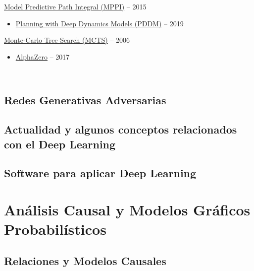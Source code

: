 \documentclass[
  a4paper,
  DIV=11,
  numbers=noendperiod]{scrreprt}
\providecommand{\tightlist}{%
  \setlength{\itemsep}{0pt}\setlength{\parskip}{0pt}}\usepackage{longtable,booktabs,array}
\begin{document}
\href{https://arxiv.org/abs/1509.01149}{Model Predictive Path Integral
(MPPI)} -- 2015

\begin{itemize}
\tightlist
\item
  \href{https://arxiv.org/abs/1909.11652}{Planning with Deep Dynamics
  Models (PDDM)} -- 2019
\end{itemize}

\href{https://hal.inria.fr/inria-00116992/document}{Monte-Carlo Tree
Search (MCTS)} -- 2006

\begin{itemize}
\tightlist
\item
  \href{https://arxiv.org/abs/1712.01815}{AlphaZero} -- 2017
\end{itemize}

~

\hypertarget{redes-generativas-adversarias}{%
\section{Redes Generativas
Adversarias}\label{redes-generativas-adversarias}}

\hypertarget{actualidad-y-algunos-conceptos-relacionados-con-el-deep-learning}{%
\section{Actualidad y algunos conceptos relacionados con el Deep
Learning}\label{actualidad-y-algunos-conceptos-relacionados-con-el-deep-learning}}

\hypertarget{software-para-aplicar-deep-learning}{%
\section{Software para aplicar Deep
Learning}\label{software-para-aplicar-deep-learning}}


\hypertarget{anuxe1lisis-causal-y-modelos-gruxe1ficos-probabiluxedsticos}{%
\chapter{Análisis Causal y Modelos Gráficos
Probabilísticos}\label{anuxe1lisis-causal-y-modelos-gruxe1ficos-probabiluxedsticos}}

\hypertarget{relaciones-y-modelos-causales}{%
\section{Relaciones y Modelos
Causales}\label{relaciones-y-modelos-causales}}
\end{document}
